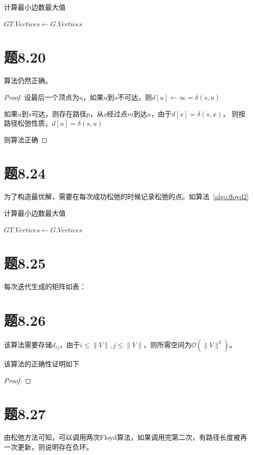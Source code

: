 \documentclass[a4paper,twoside]{article}
\begin{document}
\begin{spacing}{1.2}
\begin{algorithm}
	\caption{计算最小边数最大值}
	\label{algo:maxedgecount}
	\begin{algorithmic}[1]		
		\State $GT.Vertices\gets G.Vertices$

		\EndProcedure
	\end{algorithmic}
\end{algorithm}

\section{题8.20}

算法仍然正确。

\begin{proof}

	设最后一个顶点为$u$，如果$u$到$s$不可达，则$d[u]\gets \infty=\delta(s,u)$

	如果$u$到$s$可达，则存在路径$p$，从$s$经过点$m$到达$u$，由于$d[x]=\delta(s,x)$，
	则按路径松弛性质，$d[u]=\delta(s,u)$

	则算法正确
\end{proof}

\section{题8.24}

为了构造最优解，需要在每次成功松弛的时候记录松弛的点。如算法~\ref{algo:floyd2}

\begin{algorithm}
	\caption{计算最小边数最大值}
	\label{algo:floyd2}
	\begin{algorithmic}[1]		
		\State $GT.Vertices\gets G.Vertices$

		\EndProcedure
	\end{algorithmic}
\end{algorithm}


\section{题8.25}
每次迭代生成的矩阵如表：

\section{题8.26}

该算法需要存储$d_{ij}$，由于$i\le\|V\|,j\le\|V\|$，则所需空间为$\mathcal{O}(\|V\|^2)$。

该算法的正确性证明如下

\begin{proof}
	
\end{proof}

\section{题8.27}

由松弛方法可知，可以调用两次Floyd算法，如果调用完第二次，有路径长度被再一次更新，则说明存在负环。

\end{spacing}
\end{document}
